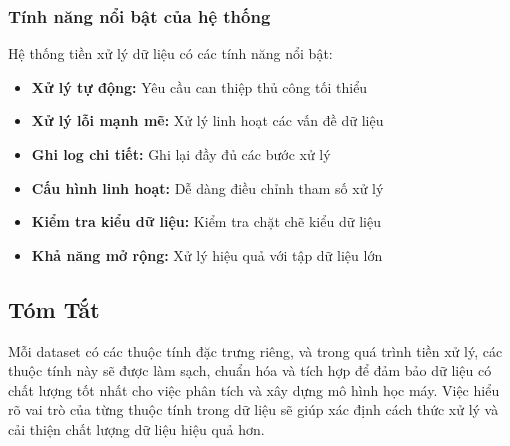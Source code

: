 \subsubsection{Tính năng nổi bật của hệ thống}

\hspace{0.5cm}Hệ thống tiền xử lý dữ liệu có các tính năng nổi bật:

\begin{itemize}
    \item \textbf{Xử lý tự động:} Yêu cầu can thiệp thủ công tối thiểu
    \item \textbf{Xử lý lỗi mạnh mẽ:} Xử lý linh hoạt các vấn đề dữ liệu
    \item \textbf{Ghi log chi tiết:} Ghi lại đầy đủ các bước xử lý
    \item \textbf{Cấu hình linh hoạt:} Dễ dàng điều chỉnh tham số xử lý
    \item \textbf{Kiểm tra kiểu dữ liệu:} Kiểm tra chặt chẽ kiểu dữ liệu
    \item \textbf{Khả năng mở rộng:} Xử lý hiệu quả với tập dữ liệu lớn
\end{itemize}

\subsection*{Tóm Tắt}
Mỗi dataset có các thuộc tính đặc trưng riêng, và trong quá trình tiền xử lý, các thuộc tính này sẽ được làm sạch, chuẩn hóa và tích hợp để đảm bảo dữ liệu có chất lượng tốt nhất cho việc phân tích và xây dựng mô hình học máy. Việc hiểu rõ vai trò của từng thuộc tính trong dữ liệu sẽ giúp xác định cách thức xử lý và cải thiện chất lượng dữ liệu hiệu quả hơn.